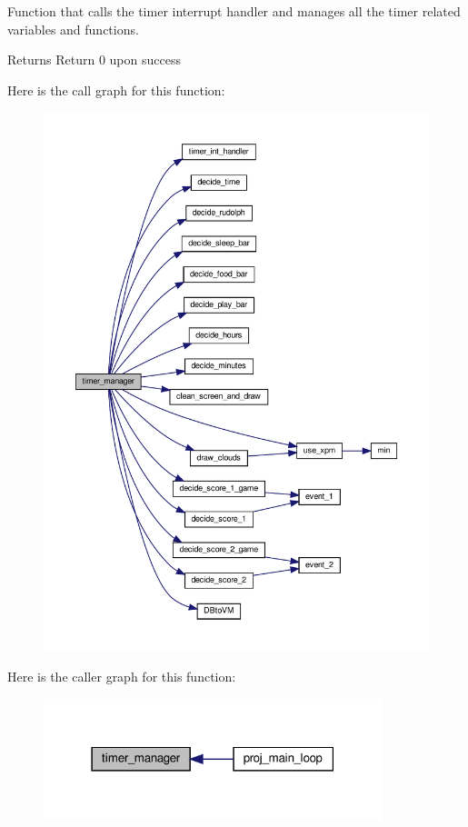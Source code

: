 Function that calls the timer interrupt handler and manages all the timer related variables and functions. 

\begin{DoxyReturn}{Returns}
Return 0 upon success 
\end{DoxyReturn}
Here is the call graph for this function\+:
\nopagebreak
\begin{figure}[H]
\begin{center}
\leavevmode
\includegraphics[width=350pt]{group__main__functions_ga230337632aac7d793969e926a66f0249_cgraph}
\end{center}
\end{figure}
Here is the caller graph for this function\+:\nopagebreak
\begin{figure}[H]
\begin{center}
\leavevmode
\includegraphics[width=279pt]{group__main__functions_ga230337632aac7d793969e926a66f0249_icgraph}
\end{center}
\end{figure}
